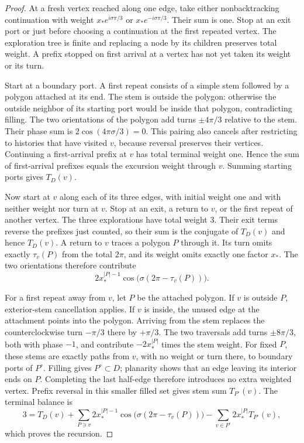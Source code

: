 \begin{proof}
At a fresh vertex reached along one edge, take either nonbacktracking
continuation with weight $x_*e^{i\sigma\pi/3}$ or
$x_*e^{-i\sigma\pi/3}$. Their sum is one. Stop at an exit port or just
before choosing a continuation at the first repeated vertex. The
exploration tree is finite and replacing a node by its children
preserves total weight. A prefix stopped on first arrival at a vertex
has not yet taken its weight or its turn.

Start at a boundary port. A first repeat consists of a simple stem
followed by a polygon attached at its end. The stem is outside the
polygon: otherwise the outside neighbor of its starting port would
be inside that polygon, contradicting filling. The two orientations
of the polygon add turns $\pm4\pi/3$ relative to the stem. Their
phase sum is $2\cos(4\pi\sigma/3)=0$. This pairing also cancels after
restricting to histories that have visited $v$, because reversal
preserves their vertices. Continuing a first-arrival prefix at $v$
has total terminal weight one. Hence the sum of first-arrival prefixes
equals the excursion weight through $v$. Summing starting ports gives
$T_D(v)$.

Now start at $v$ along each of its three edges, with initial weight one
and with neither weight nor turn at $v$. Stop at an exit, a return to
$v$, or the first repeat of another vertex. The three explorations
have total weight $3$. Their exit terms reverse the prefixes just
counted, so their sum is the conjugate of $T_D(v)$ and hence $T_D(v)$.
A return to $v$ traces a polygon $P$ through it. Its turn omits exactly
$\tau_v(P)$ from the total $2\pi$, and its weight omits exactly one
factor $x_*$. The two orientations therefore contribute
\[
 2x_*^{|P|-1}\cos\big(\sigma(2\pi-\tau_v(P))\big).
\]

For a first repeat away from $v$, let $P$ be the attached polygon. If
$v$ is outside $P$, exterior-stem cancellation applies. If $v$ is
inside, the unused edge at the attachment points into the polygon.
Arriving from the stem replaces the counterclockwise turn $-\pi/3$
there by $+\pi/3$. The two traversals add turns $\pm8\pi/3$,
both with phase $-1$, and contribute $-2x_*^{|P|}$ times the stem
weight. For fixed $P$, these stems are exactly paths from $v$, with
no weight or turn there, to boundary ports of $P^\circ$. Filling gives
$P^\circ\subset D$; planarity shows that an edge leaving its interior
ends on $P$. Completing the last half-edge therefore introduces no
extra weighted vertex. Prefix reversal in this smaller filled set
gives stem sum $T_{P^\circ}(v)$. The terminal balance is
\[
 3=T_D(v)+\sum_{P\ni v}2x_*^{|P|-1}
 \cos\big(\sigma(2\pi-\tau_v(P))\big)
 -\sum_{v\in P^\circ}2x_*^{|P|}T_{P^\circ}(v),
\]
which proves the recursion.


\end{proof}
